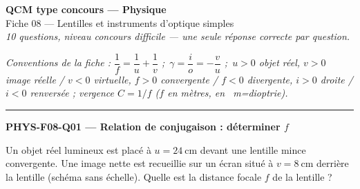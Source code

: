 \documentclass[11pt,a4paper]{article}
\begin{document}
\begin{center}
{\Large\bfseries QCM type concours --- Physique}\\[2pt]
{\large Fiche 08 --- Lentilles et instruments d'optique simples}\\[2pt]
{\itshape 10 questions, niveau concours difficile --- une seule réponse correcte par question.}
\end{center}
\vspace{4pt}
{\footnotesize\itshape Conventions de la fiche : $\dfrac1f=\dfrac1u+\dfrac1v$ ;\ $\gamma=\dfrac{i}{o}=-\dfrac{v}{u}$ ;\
$u>0$ objet réel, $v>0$ image réelle / $v<0$ virtuelle, $f>0$ convergente / $f<0$ divergente,
$i>0$ droite / $i<0$ renversée ; vergence $C=1/f$ ($f$ en mètres, en \si{\per\metre}=dioptrie).}
\vspace{6pt}\hrule\vspace{10pt}

\noindent\textbf{PHYS-F08-Q01 --- Relation de conjugaison : déterminer $f$}\par
Un objet réel lumineux est placé à $u=\qty{24}{\centi\metre}$ devant une lentille mince convergente.
Une image nette est recueillie sur un écran situé à $v=\qty{8}{\centi\metre}$ derrière la lentille
(schéma sans échelle). Quelle est la distance focale $f$ de la lentille ?

\begin{center}
\end{center}
\end{document}
